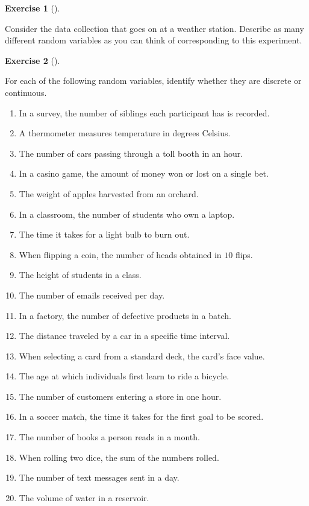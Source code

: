 \documentclass[
  letterpaper,
  DIV=11,
  numbers=noendperiod]{scrreprt}
\providecommand{\tightlist}{%
  \setlength{\itemsep}{0pt}\setlength{\parskip}{0pt}}\usepackage{longtable,booktabs,array}
\theoremstyle{definition}
\newtheorem{exercise}{Exercise}[chapter]
\theoremstyle{definition}
\theoremstyle{definition}
\theoremstyle{remark}
\begin{document}
\begin{exercise}[]\protect\hypertarget{exr-5.2}{}\label{exr-5.2}

Consider the data collection that goes on at a weather station. Describe
as many different random variables as you can think of corresponding to
this experiment.

\end{exercise}

\begin{exercise}[]\protect\hypertarget{exr-5.3}{}\label{exr-5.3}

For each of the following random variables, identify whether they are
discrete or continuous.

\begin{enumerate}
\def\labelenumi{\alph{enumi}.}
\tightlist
\item
  In a survey, the number of siblings each participant has is recorded.
\item
  A thermometer measures temperature in degrees Celsius.
\item
  The number of cars passing through a toll booth in an hour.
\item
  In a casino game, the amount of money won or lost on a single bet.
\item
  The weight of apples harvested from an orchard.
\item
  In a classroom, the number of students who own a laptop.
\item
  The time it takes for a light bulb to burn out.
\item
  When flipping a coin, the number of heads obtained in \(10\) flips.
\item
  The height of students in a class.
\item
  The number of emails received per day.
\item
  In a factory, the number of defective products in a batch.
\item
  The distance traveled by a car in a specific time interval.
\item
  When selecting a card from a standard deck, the card's face value.
\item
  The age at which individuals first learn to ride a bicycle.
\item
  The number of customers entering a store in one hour.
\item
  In a soccer match, the time it takes for the first goal to be scored.
\item
  The number of books a person reads in a month.
\item
  When rolling two dice, the sum of the numbers rolled.
\item
  The number of text messages sent in a day.
\item
  The volume of water in a reservoir.
\end{enumerate}

\end{exercise}
\end{document}
